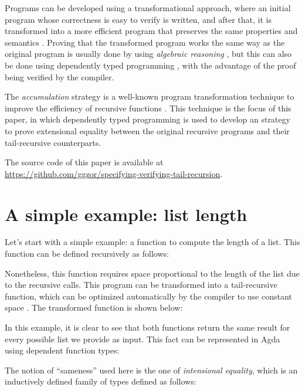 \documentclass[runningheads]{llncs}
\begin{document}
Programs can be developed using a transformational approach, where an initial program
whose correctness is easy to verify is written, and after that, it is transformed into a
more efficient program that preserves the same properties and semantics
\cite{pettorossi1993rules}. Proving that the transformed program works the same way as
the original program is usually done by using \emph{algebraic reasoning}
\cite{bird1996algebra}, but this can also be done using dependently typed programming
\cite{mu2008algebra}, with the advantage of the proof being verified by the compiler.

The \emph{accumulation} strategy is a well-known program transformation technique to
improve the efficiency of recursive functions \cite{bird1984promotion}. This technique is
the focus of this paper, in which dependently typed programming is used to develop an
strategy to prove extensional equality between the original recursive programs and their
tail-recursive counterparts.

The source code of this paper is available at
\url{https://github.com/ggzor/specifying-verifying-tail-recursion}.

\section{A simple example: list length}

Let's start with a simple example: a function to compute the length of a list. This
function can be defined recursively as follows:



Nonetheless, this function requires space proportional to the length of the list due to
the recursive calls. This program can be transformed into a tail-recursive function,
which can be optimized automatically by the compiler to use constant space
\cite{bauer2003compilation}. The transformed function is shown below:



In this example, it is clear to see that both functions return the same result for every
possible list we provide as input. This fact can be represented in Agda using dependent
function types:



The notion of ``sameness'' used here is the one of \emph{intensional equality}, which is
an inductively defined family of types \cite{dybjer1994inductive,mu2008algebra} defined
as follows:
\end{document}
